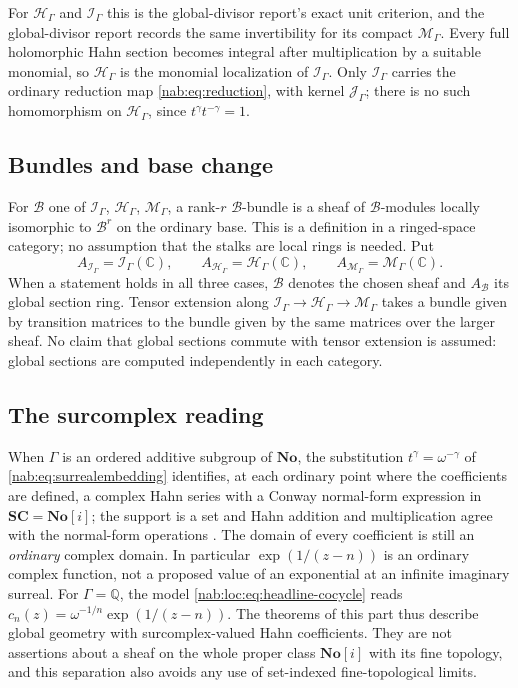 \documentclass[11pt,letterpaper]{article}
\theoremstyle{definition}
\theoremstyle{remark}
\newcommand{\C}{\mathbb C}
\newcommand{\Q}{\mathbb Q}
\newcommand{\No}{\mathbf{No}}
\newcommand{\SC}{\mathbf{SC}}
\newcommand{\HH}{\mathscr H_\Gamma}
\newcommand{\II}{\mathscr I_\Gamma}
\newcommand{\JJ}{\mathscr J_\Gamma}
\newcommand{\MM}{\mathscr M_\Gamma}
\newcommand{\BB}{\mathscr B}
\newcommand{\Aglob}{A_{\BB}}
\numberwithin{equation}{section}
\begin{document}
For $\HH$ and $\II$ this is the global-divisor report's exact unit criterion,
and the global-divisor report records the same invertibility for its compact
$\mathscr M_\Gamma$. Every full holomorphic Hahn section becomes integral after
multiplication by a suitable monomial, so $\HH$ is the monomial localization of
$\II$. Only $\II$ carries the ordinary reduction map \eqref{nab:eq:reduction},
with kernel $\JJ$; there is no such homomorphism on $\HH$, since
$t^\gamma t^{-\gamma}=1$.

\subsection{Bundles and base change}

For $\BB$ one of $\II$, $\HH$, $\MM$, a rank-$r$ $\BB$-bundle is a sheaf of
$\BB$-modules locally isomorphic to $\BB^r$ on the ordinary base. This is a
definition in a ringed-space category; no assumption that the stalks are local
rings is needed. Put
\[
 A_{\II}=\II(\C),\qquad A_{\HH}=\HH(\C),\qquad A_{\MM}=\MM(\C).
\]
When a statement holds in all three cases, $\BB$ denotes the chosen sheaf and
$\Aglob$ its global section ring. Tensor extension along
$\II\to\HH\to\MM$ takes a bundle given by transition matrices to the bundle
given by the same matrices over the larger sheaf. No claim that global sections
commute with tensor extension is assumed: global sections are computed
independently in each category.

\subsection{The surcomplex reading}

When $\Gamma$ is an ordered additive subgroup of $\No$, the substitution
$t^\gamma=\omega^{-\gamma}$ of \eqref{nab:eq:surrealembedding} identifies, at
each ordinary point where the coefficients are defined, a complex Hahn series
with a Conway normal-form expression in $\SC=\No[i]$; the support is a set and
Hahn addition and multiplication agree with the normal-form operations
\cite{Ehrlich}. The domain of every coefficient is still an \emph{ordinary}
complex domain. In particular $\exp(1/(z-n))$ is an ordinary complex function,
not a proposed value of an exponential at an infinite imaginary surreal. For
$\Gamma=\Q$, the model \eqref{nab:loc:eq:headline-cocycle} reads
$c_n(z)=\omega^{-1/n}\exp(1/(z-n))$. The theorems of this part thus describe
global geometry with surcomplex-valued Hahn coefficients. They are not
assertions about a sheaf on the whole proper class $\No[i]$ with its fine
topology, and this separation also avoids any use of set-indexed
fine-topological limits.
\end{document}
